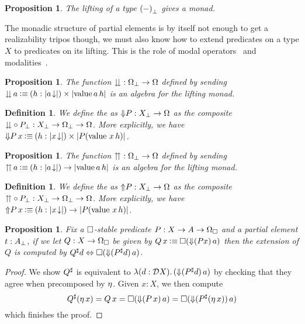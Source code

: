 \documentclass[11pt]{article}
\newtheorem{prop}[thrm]{Proposition}
\newtheorem{defn}[thrm]{Definition}
\begin{document}
\begin{prop}
  The lifting of a type \({(-)}_\bot\) gives a monad.
\end{prop}

The monadic structure of partial elements is by itself not enough to get
a realizability tripos though, we must also know how to extend predicates on
a type \(X\) to predicates on its lifting.
%
This is the role of modal operators~\cite{moggiNotionsComputationMonads1991} and
modalities~\cite{cohenPartialMonadicCombinatory2025}.

\begin{prop}
  The function \({\downdownarrows} : {\Omega}_\bot \to \Omega\) defined by
  sending
  \(
    {\downdownarrows}\,{a} \mathbin{\vcentcolon\equiv} {(h:|{{{a}\!\downarrow}}|)}\times{|{\text{value}\,{a}\,h}|}
  \)
  is an algebra for the lifting monad.
\end{prop}

\begin{defn}
  We define the  as \({\Downarrow}{P} : {X}_\bot \to \Omega\) as the
  composite
  \({\downdownarrows}\circ{P}_\bot : {X}_\bot \to {\Omega}_\bot \to \Omega\).
  More explicitly, we have
  \({\Downarrow}{P}\,x\mathbin{\vcentcolon\equiv} {(h:|{{{x}\!\downarrow}}|)}\times{|{P(\text{value}\,{\,}x\,h)}|}\).
\end{defn}

\begin{prop}
  The function \({\upuparrows} : {\Omega}_\bot \to \Omega\) defined by
  sending
  \(
    {\upuparrows}\,{a} \mathbin{\vcentcolon\equiv} {{(h:|{{{a}\!\downarrow}}|)}\to{|{\text{value}\,{a}\,h}|}}
  \)
  is an algebra for the lifting monad.
\end{prop}

\begin{defn}
  We define the  as \({\Uparrow}{P} : {X}_\bot \to \Omega\) as the
  composite
  \({\upuparrows}\circ{P}_\bot : {X}_\bot \to {\Omega}_\bot \to \Omega\).
  More explicitly, we have
  \({\Uparrow}{P}\,x\mathbin{\vcentcolon\equiv} {{(h:|{{{x}\!\downarrow}}|)}\to{|{P(\text{value}\,{\,}x\,h)}|}}\).
\end{defn}

\begin{prop}\label{prop:boxed-existential-partial-extension}
  Fix a \(\Box\)-stable predicate \(P : X \to A \to \Omega_\Box\)
  and a partial element \(t : {A}_\bot\),
  if we let \(Q:X \to \Omega_\Box\) be given by
  \(
    Q\,x \mathbin{\vcentcolon\equiv} \Box{({\Downarrow}{(Px)}\,a)}
  \)
  then the extension of \(Q\)
  is computed by
  \(
    {Q}^\sharp d \Leftrightarrow \Box{({\Downarrow}{({P}^\sharp d)}\,a)}
  \).
\end{prop}
\begin{proof}
  We show \({Q}^\sharp\) is equivalent to
  \({\mathop{\lambda({d:\mathcal{D}{X}}).}{({\Downarrow}{({P}^\sharp d)}\,a)}}\) by checking that they
  agree when precomposed by \(\eta\).
  Given \(x : X\), we then compute
  \[
    {Q}^\sharp(\eta\,{x})
    = Q\,x
    = \Box{({\Downarrow}{(P\,x)}\,a)}
    = \Box{({\Downarrow}{({P}^\sharp(\eta\,{x}))}\,a)}
  \]
  which finishes the proof.
\end{proof}
\end{document}

